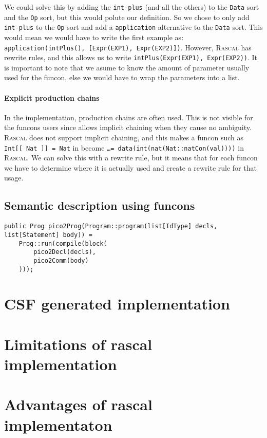 \documentclass[a4paper, oneside, notitlepage]{article}
\newcommand{\Rascal}{\textsc{Rascal}\xspace}
\newcommand{\ASFSDF}{\textsmaller{ASF-SDF}\xspace}
\newcommand{\ASF}{\textsmaller{ASF}\xspace}
\newcommand{\ADT}{\textsmaller{ADT}\xspace}
\newcommand{\code}[1]{\texttt{#1}\xspace}
\begin{document}
		We could solve this by adding the \code{int-plus} (and all the others)
		to the \code{Data} sort and the \code{Op} sort, but this would
		polute our \ADT definition.
		So we chose to only add \code{int-plus} to the \code{Op} sort and add a
		\code{application} alternative to the \code{Data} sort.
		This would mean we would have to write the first example as:
		\code{application(intPlus(), [Expr(EXP1), Expr(EXP2)])}.
		However, \Rascal has rewrite rules, and this allows us to write 
		\code{intPlus(Expr(EXP1), Expr(EXP2))}.
		It is important to note that we asume to know the amount of parameter
		usually used for the funcon, else we would have to wrap the parameters
		into a list.

		\paragraph{Explicit production chains}
		In the \ASFSDF implementation, production chains are often used.
		This is not visible for the funcons users since \ASFSDF allows implicit
		chaining when they cause no ambiguity.
		\Rascal does not support implicit chaining, and this makes a funcon such
		as \code{Int[[ Nat ]] = Nat} in \ASF become 
		\code{\ldots = data(int(nat(Nat::natCon(val))))} in \Rascal.
		We can solve this with a rewrite rule, but it means that for each funcon
		we have to determine where it is actually used and create a rewrite rule
		for that usage.
	
	\subsection{Semantic description using funcons}

	\begin{lstlisting}
public Prog pico2Prog(Program::program(list[IdType] decls, list[Statement] body)) =
	Prog::run(compile(block( 
		pico2Decl(decls), 
		pico2Comm(body)
	)));
	\end{lstlisting}


\section{CSF generated implementation}

\section{Limitations of rascal implementation}

\section{Advantages of rascal implementaton}
\end{document}
